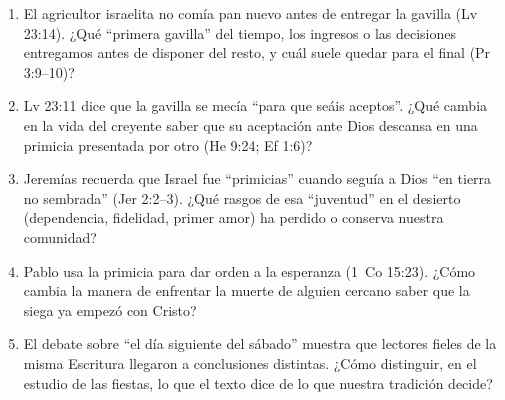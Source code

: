 \documentclass[11pt,letterpaper]{article}
\begin{document}
\begin{enumerate}
\item El agricultor israelita no comía pan nuevo antes de entregar la gavilla (Lv 23:14). ¿Qué ``primera gavilla'' del tiempo, los ingresos o las decisiones entregamos antes de disponer del resto, y cuál suele quedar para el final (Pr 3:9--10)?
\item Lv 23:11 dice que la gavilla se mecía ``para que seáis aceptos''. ¿Qué cambia en la vida del creyente saber que su aceptación ante Dios descansa en una primicia presentada por otro (He 9:24; Ef 1:6)?
\item Jeremías recuerda que Israel fue ``primicias'' cuando seguía a Dios ``en tierra no sembrada'' (Jer 2:2--3). ¿Qué rasgos de esa ``juventud'' en el desierto (dependencia, fidelidad, primer amor) ha perdido o conserva nuestra comunidad?
\item Pablo usa la primicia para dar orden a la esperanza (1~Co 15:23). ¿Cómo cambia la manera de enfrentar la muerte de alguien cercano saber que la siega ya empezó con Cristo?
\item El debate sobre ``el día siguiente del sábado'' muestra que lectores fieles de la misma Escritura llegaron a conclusiones distintas. ¿Cómo distinguir, en el estudio de las fiestas, lo que el texto dice de lo que nuestra tradición decide?
\end{enumerate}

\end{document}
